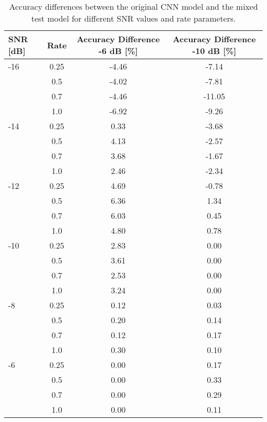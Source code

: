\begin{table}[ht]
\centering
\begin{tabular}{lccc}
\toprule
SNR [dB] & Rate & Accuracy Difference -6 dB [\%] & Accuracy Difference -10 dB [\%] \\
\midrule
-16 & 0.25 & -4.46 & -7.14 \\
 & 0.5 & -4.02 & -7.81 \\
 & 0.7 & -4.46 & -11.05 \\
 & 1.0 & -6.92 & -9.26 \\
\midrule
-14 & 0.25 & 0.33 & -3.68 \\
 & 0.5 & 4.13 & -2.57 \\
 & 0.7 & 3.68 & -1.67 \\
 & 1.0 & 2.46 & -2.34 \\
\midrule
-12 & 0.25 & 4.69 & -0.78 \\
 & 0.5 & 6.36 & 1.34 \\
 & 0.7 & 6.03 & 0.45 \\
 & 1.0 & 4.80 & 0.78 \\
\midrule
-10 & 0.25 & 2.83 & 0.00 \\
 & 0.5 & 3.61 & 0.00 \\
 & 0.7 & 2.53 & 0.00 \\
 & 1.0 & 3.24 & 0.00 \\
\midrule
-8 & 0.25 & 0.12 & 0.03 \\
 & 0.5 & 0.20 & 0.14 \\
 & 0.7 & 0.12 & 0.17 \\
 & 1.0 & 0.30 & 0.10 \\
\midrule
-6 & 0.25 & 0.00 & 0.17 \\
 & 0.5 & 0.00 & 0.33 \\
 & 0.7 & 0.00 & 0.29 \\
 & 1.0 & 0.00 & 0.11 \\
\midrule
\bottomrule
\end{tabular}
\caption{Accuracy differences between the original CNN model and the mixed test model for different SNR values and rate parameters.}
\label{tab:accuracy_diff}
\end{table}

